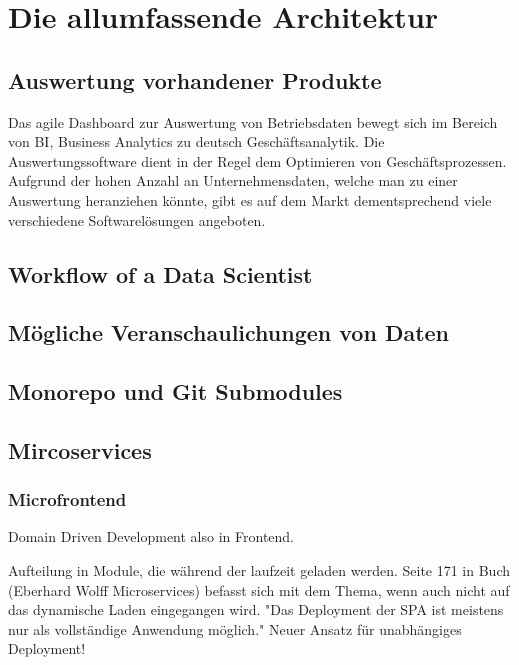 \chapter{Die allumfassende Architektur}
\label{chap:die-allumfassende-architektur}

\section{Auswertung vorhandener Produkte}

Das agile Dashboard zur Auswertung von Betriebsdaten bewegt sich im
Bereich von BI, Business Analytics zu deutsch Geschäftsanalytik. Die
Auswertungssoftware dient in der Regel dem Optimieren von Geschäftsprozessen.
Aufgrund der hohen Anzahl an Unternehmensdaten, welche man zu einer Auswertung
heranziehen könnte, gibt es auf dem Markt dementsprechend viele
verschiedene Softwarelösungen angeboten. 


\section{Workflow of a Data Scientist}

\section{Mögliche Veranschaulichungen von Daten}

\section{Monorepo und Git Submodules}

\section{Mircoservices}

\subsection{Microfrontend}
Domain Driven Development also in Frontend.

Aufteilung in Module, die während der laufzeit geladen werden.
Seite 171 in Buch (Eberhard Wolff Microservices) befasst sich mit dem
Thema, wenn auch nicht auf das dynamische Laden eingegangen wird.
"Das Deployment der SPA ist meistens nur als vollständige Anwendung möglich."
Neuer Ansatz für unabhängiges Deployment!

